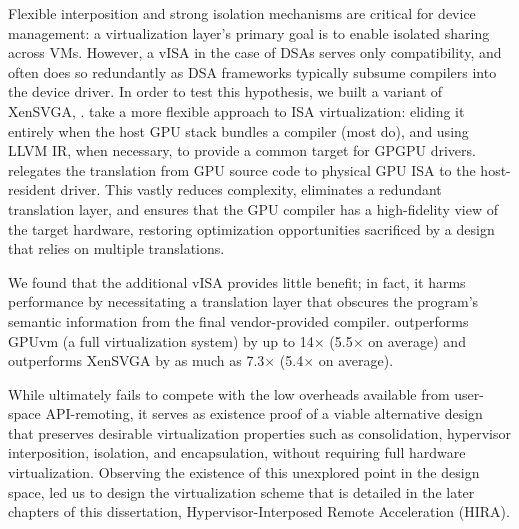 Flexible interposition and strong isolation mechanisms are critical for device
management: a virtualization layer's primary goal is to enable isolated
sharing across VMs. However, a vISA in the case of DSAs serves only
compatibility, and often does so redundantly as DSA frameworks typically
subsume compilers into the device driver.
In order to test this hypothesis, we built a variant of XenSVGA, \Trillium.
\Trillium take a more flexible approach to ISA virtualization: eliding it
entirely when the host GPU stack bundles a compiler (most do), and using LLVM
IR, when necessary, to provide a common target for GPGPU drivers. \Trillium
relegates the translation from GPU source code to physical GPU ISA to the
host-resident driver. This vastly reduces complexity, eliminates a redundant
translation layer, and ensures that the GPU compiler has a high-fidelity view
of the target hardware, restoring optimization opportunities sacrificed by a
design that relies on multiple translations.

We found that the additional vISA provides little benefit; in fact, it harms
performance by necessitating a translation layer that obscures the program's
semantic information from the final vendor-provided compiler. \Trillium
outperforms GPUvm (a full virtualization system) by up to 14$\times$
(5.5$\times$ on average) and outperforms XenSVGA by as much as 7.3$\times$
(5.4$\times$ on average).

While \Trillium ultimately fails to compete with the low overheads available
from user-space API-remoting, it serves as existence proof of a viable
alternative design that preserves desirable virtualization properties such as
consolidation, hypervisor interposition, isolation, and encapsulation, without
requiring full hardware virtualization. Observing the existence of this
unexplored point in the design space, led us to design the virtualization
scheme that is detailed in the later chapters of this dissertation,
Hypervisor-Interposed Remote Acceleration (HIRA).